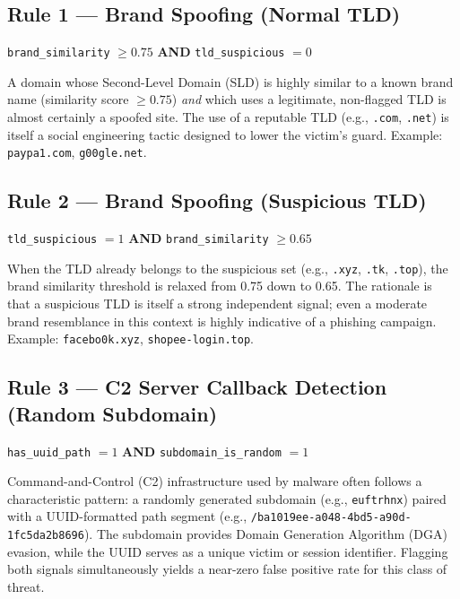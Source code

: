 \documentclass[12pt,a4paper]{article}
\begin{document}
\subsection{Rule 1 --- Brand Spoofing (Normal TLD)}
\begin{center}
\texttt{brand\_similarity} $\geq 0.75$ \quad \textbf{AND} \quad \texttt{tld\_suspicious} $= 0$
\end{center}
\noindent A domain whose Second-Level Domain (SLD) is highly similar to a known brand name (similarity score $\geq 0.75$) \textit{and} which uses a legitimate, non-flagged TLD is almost certainly a spoofed site. The use of a reputable TLD (e.g., \texttt{.com}, \texttt{.net}) is itself a social engineering tactic designed to lower the victim's guard. Example: \texttt{paypa1.com}, \texttt{g00gle.net}.

\subsection{Rule 2 --- Brand Spoofing (Suspicious TLD)}
\begin{center}
\texttt{tld\_suspicious} $= 1$ \quad \textbf{AND} \quad \texttt{brand\_similarity} $\geq 0.65$
\end{center}
\noindent When the TLD already belongs to the suspicious set (e.g., \texttt{.xyz}, \texttt{.tk}, \texttt{.top}), the brand similarity threshold is relaxed from 0.75 down to 0.65. The rationale is that a suspicious TLD is itself a strong independent signal; even a moderate brand resemblance in this context is highly indicative of a phishing campaign. Example: \texttt{facebo0k.xyz}, \texttt{shopee-login.top}.

\subsection{Rule 3 --- C2 Server Callback Detection (Random Subdomain)}
\begin{center}
\texttt{has\_uuid\_path} $= 1$ \quad \textbf{AND} \quad \texttt{subdomain\_is\_random} $= 1$
\end{center}
\noindent Command-and-Control (C2) infrastructure used by malware often follows a characteristic pattern: a randomly generated subdomain (e.g., \texttt{euftrhnx}) paired with a UUID-formatted path segment (e.g., \texttt{/ba1019ee-a048-4bd5-a90d-1fc5da2b8696}). The subdomain provides Domain Generation Algorithm (DGA) evasion, while the UUID serves as a unique victim or session identifier. Flagging both signals simultaneously yields a near-zero false positive rate for this class of threat.
\end{document}
